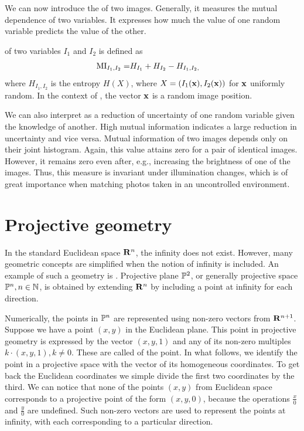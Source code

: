 We can now introduce the  of two images. 
Generally, it measures the mutual dependence of two variables. 
It expresses how much the value of one random variable predicts the value of the other.
\begin{definition}
 of two variables $I_1$ and $I_2$ is defined as
\begin{align*}
\MI{I_1, I_2} = & \H{I_1} + \H{I_2} - \H{I_1, I_2},
\end{align*}  
where $H_{I_1, I_2}$ is the entropy $H(X)$, where $X = (I_1(\x), I_2(\x))$ for $\x$ uniformly random. 
In the context of \cv, the vector $\x$ is a random image position. 
\end{definition}
We can also interpret  as a reduction of uncertainty of one random variable given the knowledge of another.
High mutual information indicates a large reduction in uncertainty and vice versa. 
Mutual information of two images depends only on their joint histogram. 
Again, this value attains zero for a pair of identical images. 
However, it remains zero even after, e.g., increasing the brightness of one of the images. 
Thus, this measure is invariant under illumination changes, which is of great importance when matching photos taken in an uncontrolled environment. 

\section{Projective geometry}
\label{sec:projective}

In the standard Euclidean space $\R^n$, the infinity does not exist.
However, many geometric concepts are simplified when the notion of infinity is included.
An example of such a geometry is .
Projective plane $\P^2$, or generally projective space $\P^n, n \in \N$, is obtained by extending $\R^n$ by including a point at infinity for each direction.

Numerically, the points in $\P^n$ are represented using non-zero vectors from $\R^{n+1}$.
Suppose we have a point $(x, y)$ in the Euclidean plane.
This point in projective geometry is expressed by the vector $(x, y, 1)$ and any of its non-zero multiples $k \cdot (x, y, 1), k \neq 0$.
These are called  of the point.
In what follows, we identify the point in a projective space with the vector of its homogeneous coordinates. 
To get back the Euclidean coordinates we simple divide the first two coordinates by the third.
We can notice that none of the points $(x, y)$ from Euclidean space corresponds to a projective point of the form $(x, y, 0)$, because the operations $\frac{x}{0}$ and $\frac{y}{0}$ are undefined.
Such non-zero vectors are used to represent the points at infinity, with each corresponding to a particular direction. 

